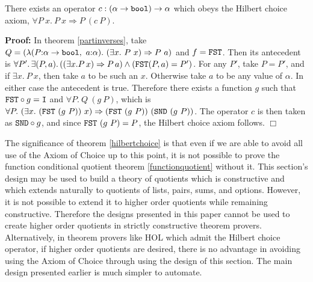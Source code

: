 \documentclass[envcountsame,runningheads]{llncs}
\begin{document}
\begin{theorem}
\label{hilbertchoice}
There exists an operator $c:(\alpha \rightarrow {\tt bool}) \rightarrow \alpha$
which obeys the Hilbert choice axiom,
$\forall P\ x.\ P\ x \Rightarrow P\ (c\ P)$.
\end{theorem}

{\bf Proof:}
In theorem \ref{partinverses}, 
take $Q = (\lambda(P{\tt :}\alpha \rightarrow {\tt bool},\ a{\tt :}\alpha).\ 
                  (\exists x.\ P\ x) \Rightarrow P\ a)$
and $f = {\tt FST}$.  Then its antecedent is
$\forall P'.\, \exists (P,a).\, ((\exists x. P\, x) \Rightarrow P\, a) \wedge ({\tt FST} (P,a) = P')$.
%
%
For any $P'$, take $P = P'$, and if $\exists x.\ P\ x$,
then take $a$ to be such an $x$.
Otherwise take $a$ to be any value of $\alpha$.
In either case the antecedent is true.
Therefore there exists a function $g$ such that
${\tt FST} \circ g = {\tt I}$
and
$\forall P.\ Q\ (g\ P)$,
which is
$\forall P.\
(\exists x.\ ({\tt FST}\ (g\ P))\ x) \Rightarrow ({\tt FST}\ (g\ P))\ ({\tt SND}\ (g\ P))$.
The operator $c$ is then taken as ${\tt SND} \circ g$,
and
since ${\tt FST}\ (g\ P) = P$,
the Hilbert choice axiom follows.
$\Box$

The significance of theorem 
\ref{hilbertchoice}
is that even if we are able to avoid all use of the Axiom of Choice up to
this point, it is not possible to prove the function conditional quotient
theorem 
\ref{functionquotient}
without it.  
This section's design
may be used
to build a theory of quotients which is constructive and which extends
naturally to quotients of lists, pairs, sums, and options.
However, it is not possible
to extend it to higher order quotients while remaining constructive. 
Therefore
the designs presented in this paper cannot be used to create higher order
quotients in strictly constructive theorem provers. 
Alternatively, in theorem
provers like HOL which admit the Hilbert choice operator,
if higher order quotients are desired,
there is no advantage in avoiding using the Axiom of Choice 
through using the design of this section.
The main design presented earlier is much simpler to automate.
\end{document}
